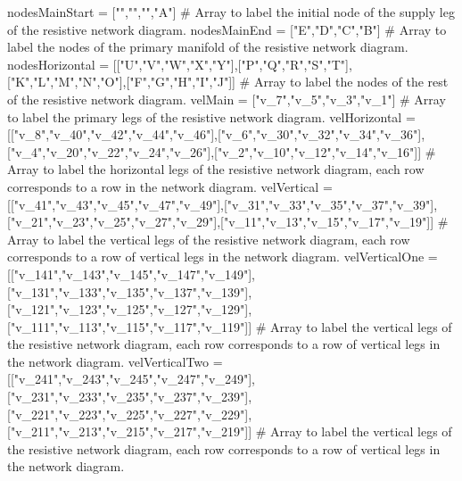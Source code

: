 \documentclass[12pt, oneside]{article}   	%
\begin{document}
\begin{circuitikz}[font=\tiny] %

\def\hspc{3.2} %
\def\vspc{4} %
\def\vertLength{1.5} %
\def\vertOffset{0} %

\begin{pycode}

nodesMainStart = ["","","","A"] # Array to label the initial node of the supply leg of the resistive network diagram.
nodesMainEnd = ["E","D","C","B"] # Array to label the nodes of the primary manifold of the resistive network diagram.
nodesHorizontal = [["U","V","W","X","Y"],["P","Q","R","S","T"],["K","L","M","N","O"],["F","G","H","I","J"]] # Array to label the nodes of the rest of the resistive network diagram.
velMain = ["v_7","v_5","v_3","v_1"] # Array to label the primary legs of the resistive network diagram.
velHorizontal = [["v_8","v_40","v_42","v_44","v_46"],["v_6","v_30","v_32","v_34","v_36"],["v_4","v_20","v_22","v_24","v_26"],["v_2","v_10","v_12","v_14","v_16"]] # Array to label the horizontal legs of the resistive network diagram, each row corresponds to a row in the network diagram.
velVertical = [["v_41","v_43","v_45","v_47","v_49"],["v_31","v_33","v_35","v_37","v_39"],["v_21","v_23","v_25","v_27","v_29"],["v_11","v_13","v_15","v_17","v_19"]] # Array to label the vertical legs of the resistive network diagram, each row corresponds to a row of vertical legs in the network diagram.
velVerticalOne = [["v_141","v_143","v_145","v_147","v_149"],["v_131","v_133","v_135","v_137","v_139"],["v_121","v_123","v_125","v_127","v_129"],["v_111","v_113","v_115","v_117","v_119"]] # Array to label the vertical legs of the resistive network diagram, each row corresponds to a row of vertical legs in the network diagram.
velVerticalTwo = [["v_241","v_243","v_245","v_247","v_249"],["v_231","v_233","v_235","v_237","v_239"],["v_221","v_223","v_225","v_227","v_229"],["v_211","v_213","v_215","v_217","v_219"]] # Array to label the vertical legs of the resistive network diagram, each row corresponds to a row of vertical legs in the network diagram.


\end{pycode}
\end{circuitikz}
\end{document}

